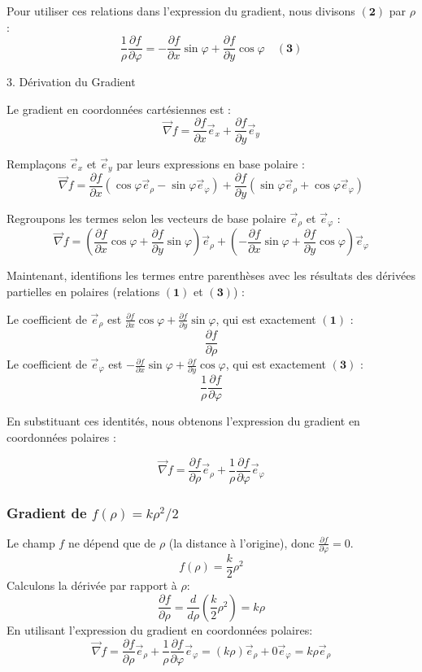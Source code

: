 \documentclass[french]{yLectureNote}
\renewcommand{\vec}{\overrightarrow}
\begin{document}
Pour utiliser ces relations dans l'expression du gradient, nous divisons $\mathbf{(2)}$ par $\rho$ :
$$
\frac{1}{\rho}\frac{\partial f}{\partial \varphi} = -\frac{\partial f}{\partial x}\sin \varphi + \frac{\partial f}{\partial y}\cos \varphi \quad \mathbf{(3)}
$$

3. Dérivation du Gradient

Le gradient en coordonnées cartésiennes est :
$$
\vec{\nabla}f = \frac{\partial f}{\partial x}\vec{e}_{x} + \frac{\partial f}{\partial y}\vec{e}_{y}
$$

Remplaçons $\vec{e}_{x}$ et $\vec{e}_{y}$ par leurs expressions en base polaire :
$$
\vec{\nabla}f = \frac{\partial f}{\partial x}(\cos \varphi \vec{e}_{\rho} - \sin \varphi \vec{e}_{\varphi}) + \frac{\partial f}{\partial y}(\sin \varphi \vec{e}_{\rho} + \cos \varphi \vec{e}_{\varphi})
$$

Regroupons les termes selon les vecteurs de base polaire $\vec{e}_{\rho}$ et $\vec{e}_{\varphi}$ :
$$
\vec{\nabla}f = \left(\frac{\partial f}{\partial x}\cos \varphi + \frac{\partial f}{\partial y}\sin \varphi\right)\vec{e}_{\rho} + \left(-\frac{\partial f}{\partial x}\sin \varphi + \frac{\partial f}{\partial y}\cos \varphi\right)\vec{e}_{\varphi}
$$

Maintenant, identifions les termes entre parenthèses avec les résultats des dérivées partielles en polaires (relations $\mathbf{(1)}$ et $\mathbf{(3)}$) :

Le coefficient de $\vec{e}_{\rho}$ est $\frac{\partial f}{\partial x}\cos \varphi + \frac{\partial f}{\partial y}\sin \varphi$, qui est exactement $\mathbf{(1)}$ :
    $$
    \frac{\partial f}{\partial \rho}
    $$
Le coefficient de $\vec{e}_{\varphi}$ est $-\frac{\partial f}{\partial x}\sin \varphi + \frac{\partial f}{\partial y}\cos \varphi$, qui est exactement $\mathbf{(3)}$ :
    $$
    \frac{1}{\rho}\frac{\partial f}{\partial \varphi}
    $$


En substituant ces identités, nous obtenons l'expression du gradient en coordonnées polaires :

$$
\vec{\nabla}f = \frac{\partial f}{\partial\rho}\vec{e}_{\rho}+\frac{1}{\rho}\frac{\partial f}{\partial\varphi}\vec{e}_{\varphi}
$$

\subsubsection{Gradient de $f(\rho)=k\rho^{2}/2$}

Le champ $f$ ne dépend que de $\rho$ (la distance à l'origine), donc $\frac{\partial f}{\partial \varphi} = 0$.
$$
f(\rho) = \frac{k}{2}\rho^{2}
$$
Calculons la dérivée par rapport à $\rho$:
$$
\frac{\partial f}{\partial \rho} = \frac{d}{d\rho}\left(\frac{k}{2}\rho^{2}\right) = k\rho
$$
En utilisant l'expression du gradient en coordonnées polaires:
$$
\vec{\nabla}f = \frac{\partial f}{\partial\rho}\vec{e}_{\rho}+\frac{1}{\rho}\frac{\partial f}{\partial\varphi}\vec{e}_{\varphi} = (k\rho)\vec{e}_{\rho} + 0\vec{e}_{\varphi} = k\rho\vec{e}_{\rho}
$$
\end{document}
